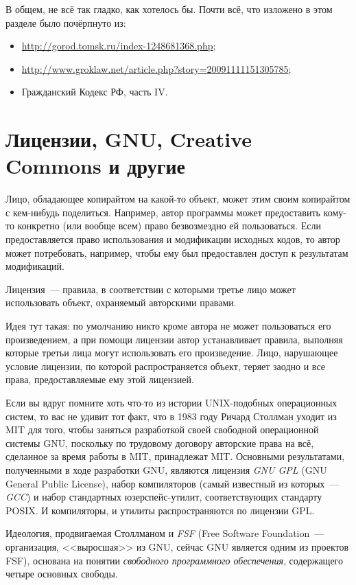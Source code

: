 В общем, не всё так гладко, как хотелось бы. Почти всё, что изложено в этом разделе было почёрпнуто из:
\begin{itemize}
    \item \url{http://gorod.tomsk.ru/index-1248681368.php};
    \item \url{http://www.groklaw.net/article.php?story=20091111151305785};
    \item Гражданский Кодекс РФ, часть IV.
\end{itemize}

\section{Лицензии, GNU, Creative Commons и другие}

Лицо, обладающее копирайтом на какой-то объект, может этим своим копирайтом с кем-нибудь поделиться.
Например, автор программы может предоставить кому-то конкретно (или вообще всем) право безвозмездно ей пользоваться.
Если предоставляется право использования и модификации исходных кодов, то автор может потребовать, например, чтобы ему был предоставлен доступ к результатам модификаций.

\begin{definition}
Лицензия~--- правила, в соответствии с которыми третье лицо может использовать объект, охраняемый авторскими правами.
\end{definition}

Идея тут такая: по умолчанию никто кроме автора не может пользоваться его произведением, а при помощи лицензии автор устанавливает правила, выполняя которые третьи лица могут использовать его произведение.
Лицо, нарушающее условие лицензии, по которой распространяется объект, теряет заодно и все права, предоставляемые ему этой лицензией.

Если вы вдруг помните хоть что-то из истории UNIX-подобных операционных систем, то вас не удивит тот факт, что в 1983 году Ричард Столлман уходит из MIT для того, чтобы заняться разработкой своей свободной операционной системы GNU, поскольку по трудовому договору авторские права на всё, сделанное за время работы в MIT, принадлежат MIT.
Основными результатами, полученными в ходе разработки GNU, являются лицензия \emph{GNU GPL} (GNU General Public License), набор компиляторов (самый известный из которых~--- \emph{GCC}) и набор стандартных юзерспейс-утилит, соответствующих стандарту POSIX.
И компиляторы, и утилиты распространяются по лицензии GPL.

Идеология, продвигаемая Столлманом и \emph{FSF} (Free Software Foundation~--- организация, <<выросшая>> из GNU, сейчас GNU является одним из проектов FSF), основана на понятии \emph{свободного программного обеспечения}, содержащего четыре основных свободы.

